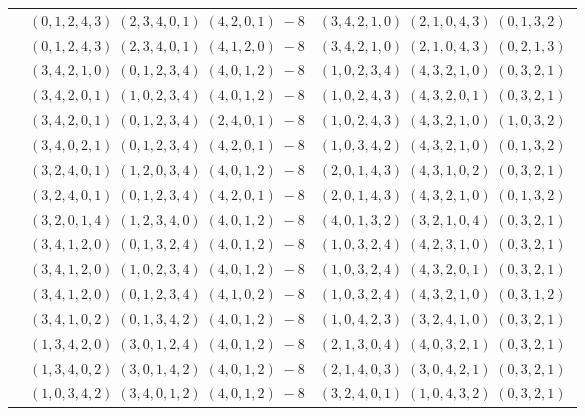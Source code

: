 \documentclass[11pt]{article}
\begin{document}
\begin{longtable}[l]{|c|c|c|}
 \cline{2-3} 
 & $(0 ,1 ,2 ,4 ,3) \;(2 ,3 ,4 ,0 ,1) \;(4 ,2 ,0 ,1) \;-8$ & $(3 ,4 ,2 ,1 ,0) \;(2 ,1 ,0 ,4 ,3) \;(0 ,1 ,3 ,2) \;$\\ 
 \cline{2-3} 
 & $(0 ,1 ,2 ,4 ,3) \;(2 ,3 ,4 ,0 ,1) \;(4 ,1 ,2 ,0) \;-8$ & $(3 ,4 ,2 ,1 ,0) \;(2 ,1 ,0 ,4 ,3) \;(0 ,2 ,1 ,3) \;$\\ 
 \cline{2-3} 
 & $(3 ,4 ,2 ,1 ,0) \;(0 ,1 ,2 ,3 ,4) \;(4 ,0 ,1 ,2) \;-8$ & $(1 ,0 ,2 ,3 ,4) \;(4 ,3 ,2 ,1 ,0) \;(0 ,3 ,2 ,1) \;$\\ 
 \cline{2-3} 
 & $(3 ,4 ,2 ,0 ,1) \;(1 ,0 ,2 ,3 ,4) \;(4 ,0 ,1 ,2) \;-8$ & $(1 ,0 ,2 ,4 ,3) \;(4 ,3 ,2 ,0 ,1) \;(0 ,3 ,2 ,1) \;$\\ 
 \cline{2-3} 
 & $(3 ,4 ,2 ,0 ,1) \;(0 ,1 ,2 ,3 ,4) \;(2 ,4 ,0 ,1) \;-8$ & $(1 ,0 ,2 ,4 ,3) \;(4 ,3 ,2 ,1 ,0) \;(1 ,0 ,3 ,2) \;$\\ 
 \cline{2-3} 
 & $(3 ,4 ,0 ,2 ,1) \;(0 ,1 ,2 ,3 ,4) \;(4 ,2 ,0 ,1) \;-8$ & $(1 ,0 ,3 ,4 ,2) \;(4 ,3 ,2 ,1 ,0) \;(0 ,1 ,3 ,2) \;$\\ 
 \cline{2-3} 
 & $(3 ,2 ,4 ,0 ,1) \;(1 ,2 ,0 ,3 ,4) \;(4 ,0 ,1 ,2) \;-8$ & $(2 ,0 ,1 ,4 ,3) \;(4 ,3 ,1 ,0 ,2) \;(0 ,3 ,2 ,1) \;$\\ 
 \cline{2-3} 
 & $(3 ,2 ,4 ,0 ,1) \;(0 ,1 ,2 ,3 ,4) \;(4 ,2 ,0 ,1) \;-8$ & $(2 ,0 ,1 ,4 ,3) \;(4 ,3 ,2 ,1 ,0) \;(0 ,1 ,3 ,2) \;$\\ 
 \cline{2-3} 
 & $(3 ,2 ,0 ,1 ,4) \;(1 ,2 ,3 ,4 ,0) \;(4 ,0 ,1 ,2) \;-8$ & $(4 ,0 ,1 ,3 ,2) \;(3 ,2 ,1 ,0 ,4) \;(0 ,3 ,2 ,1) \;$\\ 
 \cline{2-3} 
 & $(3 ,4 ,1 ,2 ,0) \;(0 ,1 ,3 ,2 ,4) \;(4 ,0 ,1 ,2) \;-8$ & $(1 ,0 ,3 ,2 ,4) \;(4 ,2 ,3 ,1 ,0) \;(0 ,3 ,2 ,1) \;$\\ 
 \cline{2-3} 
 & $(3 ,4 ,1 ,2 ,0) \;(1 ,0 ,2 ,3 ,4) \;(4 ,0 ,1 ,2) \;-8$ & $(1 ,0 ,3 ,2 ,4) \;(4 ,3 ,2 ,0 ,1) \;(0 ,3 ,2 ,1) \;$\\ 
 \cline{2-3} 
 & $(3 ,4 ,1 ,2 ,0) \;(0 ,1 ,2 ,3 ,4) \;(4 ,1 ,0 ,2) \;-8$ & $(1 ,0 ,3 ,2 ,4) \;(4 ,3 ,2 ,1 ,0) \;(0 ,3 ,1 ,2) \;$\\ 
 \cline{2-3} 
 & $(3 ,4 ,1 ,0 ,2) \;(0 ,1 ,3 ,4 ,2) \;(4 ,0 ,1 ,2) \;-8$ & $(1 ,0 ,4 ,2 ,3) \;(3 ,2 ,4 ,1 ,0) \;(0 ,3 ,2 ,1) \;$\\ 
 \cline{2-3} 
 & $(1 ,3 ,4 ,2 ,0) \;(3 ,0 ,1 ,2 ,4) \;(4 ,0 ,1 ,2) \;-8$ & $(2 ,1 ,3 ,0 ,4) \;(4 ,0 ,3 ,2 ,1) \;(0 ,3 ,2 ,1) \;$\\ 
 \cline{2-3} 
 & $(1 ,3 ,4 ,0 ,2) \;(3 ,0 ,1 ,4 ,2) \;(4 ,0 ,1 ,2) \;-8$ & $(2 ,1 ,4 ,0 ,3) \;(3 ,0 ,4 ,2 ,1) \;(0 ,3 ,2 ,1) \;$\\ 
 \cline{2-3} 
 & $(1 ,0 ,3 ,4 ,2) \;(3 ,4 ,0 ,1 ,2) \;(4 ,0 ,1 ,2) \;-8$ & $(3 ,2 ,4 ,0 ,1) \;(1 ,0 ,4 ,3 ,2) \;(0 ,3 ,2 ,1) \;$\\ 

\end{longtable}
\end{document}
